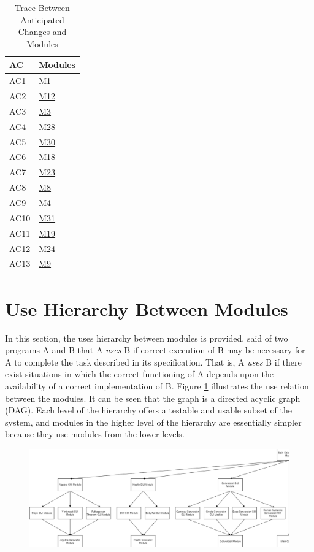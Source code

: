\documentclass[12pt, titlepage]{article}
\begin{document}
\begin{table}[H]
\centering
\begin{tabular}{p{} p{}}
\toprule
\textbf{AC} & \textbf{Modules}\\
\midrule
AC1 & \hyperref[m1]{M1}\\
AC2 & \hyperref[m12]{M12}\\
AC3 & \hyperref[m3]{M3}\\
AC4 & \hyperref[m28]{M28}\\
AC5 & \hyperref[m30]{M30}\\
AC6 & \hyperref[m18]{M18}\\
AC7 & \hyperref[m23]{M23}\\
AC8 & \hyperref[m8]{M8}\\
AC9 & \hyperref[m4]{M4} \\
AC10 & \hyperref[m31]{M31}\\
AC11 & \hyperref[m19]{M19}\\
AC12 & \hyperref[m24]{M24}\\
AC13 & \hyperref[m9]{M9}\\
\bottomrule
\end{tabular}
\caption{Trace Between Anticipated Changes and Modules}
\label{TblACT}
\end{table}

\section{Use Hierarchy Between Modules} \label{SecUse}

In this section, the uses hierarchy between modules is
provided. \citet{Parnas1978} said of two programs A and B that A {\em uses} B if
correct execution of B may be necessary for A to complete the task described in
its specification. That is, A {\em uses} B if there exist situations in which
the correct functioning of A depends upon the availability of a correct
implementation of B.  Figure \ref{FigUH} illustrates the use relation between
the modules. It can be seen that the graph is a directed acyclic graph
(DAG). Each level of the hierarchy offers a testable and usable subset of the
system, and modules in the higher level of the hierarchy are essentially simpler
because they use modules from the lower levels.

\newpage

\begin{figure}[H]
\centering
\includegraphics[scale=0.7, angle=270]{UsesHierarchy1.png}
\label{FigUH}
\end{figure}
\end{document}
